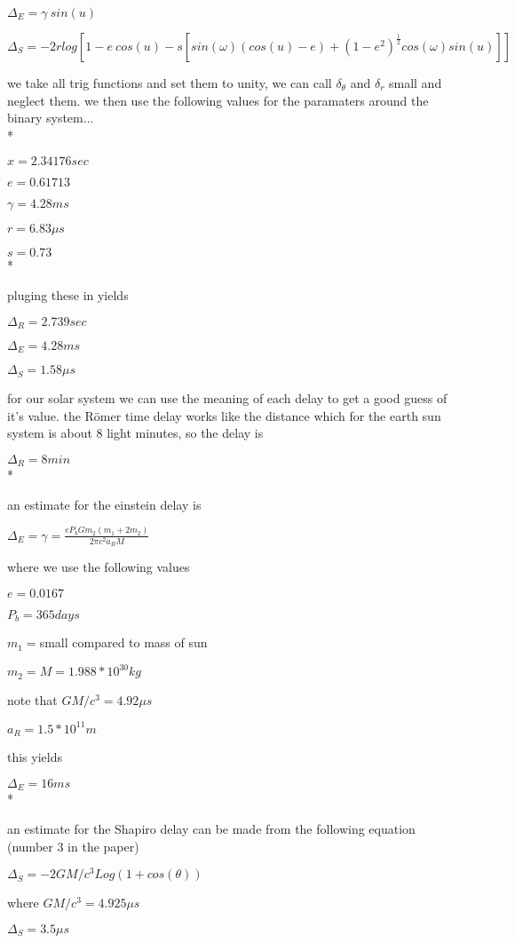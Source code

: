\documentclass{article}
\begin{document}
$\Delta_E=\gamma \  sin(u)$

$\Delta_S=-2r log[1-e\ cos(u)-s[sin(\omega)(cos(u)-e)+(1-e^2)^{\frac{1}{2}}cos(\omega)sin(u)]]$

we take all trig functions and set them to unity, we can call $\delta_\theta$ and $\delta_r$ small and neglect them. we then use the following values for the paramaters around the binary system...
\\*

$x=2.34176 sec$

$e=0.61713$

$\gamma=4.28 ms$

$r=6.83 \mu s$

$s=0.73$
\\*

pluging these in yields

$\Delta_R=2.739 sec$

$\Delta_E=4.28 ms$

$\Delta_S=1.58 \mu s$

for our solar system we can use the meaning of each delay to get a good guess of it's value. the R\"{o}mer time delay works like the distance which for the earth sun system is about 8 light minutes, so the delay is 

$\Delta_R=8 min$
\\*

an estimate for the einstein delay is 

$\Delta_E=\gamma=\frac{eP_bGm_2(m_1+2m_2)}{2\pi c^2a_RM}$

where we use the following values

$e=0.0167$

$P_b=365 days$

$m_1=$small compared to mass of sun

$m_2=M=1.988*10^{30} kg$

note that $GM/c^3=4.92 \mu s$

$a_R=1.5*10^{11} m$

this yields 

$\Delta_E=16 ms$
\\*

an estimate for the Shapiro delay can be made from the following equation (number 3 in the paper)

$\Delta_S=-2GM/c^3 Log(1+cos(\theta))$

where $GM/c^3=4.925 \mu s$

$\Delta_S=3.5 \mu s$
\end{document}

